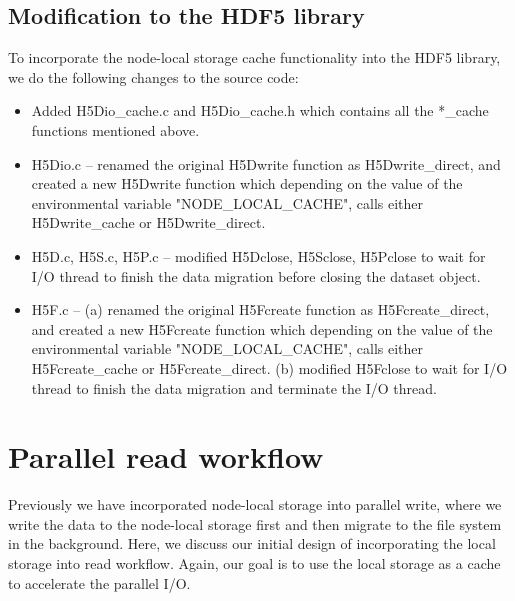 \documentclass[aps, rmp, 11pt, notitlepage]{revtex4-1}
\begin{document}
\subsection{Modification to the HDF5 library}
To incorporate the node-local storage cache functionality into the HDF5 library, we do the following changes to the source code: 
\begin{itemize}
\item Added H5Dio\_cache.c and H5Dio\_cache.h which contains all the *\_cache functions mentioned above.
\item H5Dio.c -- renamed the original H5Dwrite function as H5Dwrite\_direct, and created a new H5Dwrite function which depending on the value of the environmental variable "NODE\_LOCAL\_CACHE", calls either H5Dwrite\_cache or H5Dwrite\_direct. 
\item H5D.c, H5S.c, H5P.c -- modified H5Dclose, H5Sclose, H5Pclose to wait for I/O thread to finish the data migration before closing the dataset object. 
\item H5F.c -- (a) renamed the original H5Fcreate function as H5Fcreate\_direct, and created a new H5Fcreate function which depending on the value of the environmental variable "NODE\_LOCAL\_CACHE", calls either H5Fcreate\_cache or H5Fcreate\_direct. (b) modified H5Fclose to wait for I/O thread to finish the data migration and terminate the I/O thread. 
\end{itemize}

\section{Parallel read workflow}
Previously we have incorporated node-local storage into parallel write, where we write the data to the node-local storage first and then migrate to the file system in the background. Here, we discuss our initial design of incorporating the local storage into read workflow. Again, our goal is to use the local storage as a cache to accelerate the parallel I/O.
\end{document}
